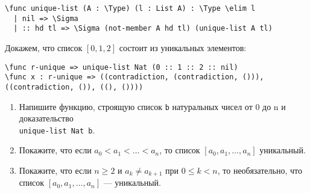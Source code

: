 \documentclass[10pt,a4paper,oneside]{article}
\begin{document}
\begin{enumerate}
\begin{verbatim}
\func unique-list (A : \Type) (l : List A) : \Type \elim l
  | nil => \Sigma
  | :: hd tl => \Sigma (not-member A hd tl) (unique-list A tl)
\end{verbatim}

Докажем, что список $[0,1,2]$ состоит из уникальных элементов:
\begin{verbatim}
\func r-unique => unique-list Nat (0 :: 1 :: 2 :: nil)
\func x : r-unique => ((contradiction, (contradiction, ())), ((contradiction, ()), ((), ())))
\end{verbatim}

\begin{enumerate} 
\item Напишите функцию, строящую список \verb!b! натуральных чисел от 0 до n и доказательство\\ \verb!unique-list Nat b!.
\item Покажите, что если $a_0 < a_1 < \dots < a_n$, то список $[a_0,a_1,\dots,a_n]$ уникальный.
\item Покажите, что если $n \ge 2$ и $a_k \ne a_{k+1}$ при $0 \le k < n$, то необязательно, что список
$[a_0,a_1,\dots,a_n]$ --- уникальный.
\end{enumerate}
\end{enumerate}
\end{document}

